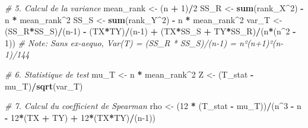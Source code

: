 \documentclass[
  12pt,
]{article}
\newenvironment{Shaded}{\begin{snugshade}}{\end{snugshade}}
\newcommand{\CommentTok}[1]{\textcolor[rgb]{0.56,0.35,0.01}{\textit{#1}}}
\newcommand{\DecValTok}[1]{\textcolor[rgb]{0.00,0.00,0.81}{#1}}
\newcommand{\FunctionTok}[1]{\textcolor[rgb]{0.13,0.29,0.53}{\textbf{#1}}}
\newcommand{\NormalTok}[1]{#1}
\newcommand{\OtherTok}[1]{\textcolor[rgb]{0.56,0.35,0.01}{#1}}
\newcommand{\SpecialCharTok}[1]{\textcolor[rgb]{0.81,0.36,0.00}{\textbf{#1}}}
\begin{document}
\begin{Shaded}
\begin{Highlighting}[]
  \CommentTok{\# 5. Calcul de la variance}
\NormalTok{  mean\_rank }\OtherTok{\textless{}{-}}\NormalTok{ (n }\SpecialCharTok{+} \DecValTok{1}\NormalTok{)}\SpecialCharTok{/}\DecValTok{2}
\NormalTok{  SS\_R }\OtherTok{\textless{}{-}} \FunctionTok{sum}\NormalTok{(rank\_X}\SpecialCharTok{\^{}}\DecValTok{2}\NormalTok{) }\SpecialCharTok{{-}}\NormalTok{ n }\SpecialCharTok{*}\NormalTok{ mean\_rank}\SpecialCharTok{\^{}}\DecValTok{2}
\NormalTok{  SS\_S }\OtherTok{\textless{}{-}} \FunctionTok{sum}\NormalTok{(rank\_Y}\SpecialCharTok{\^{}}\DecValTok{2}\NormalTok{) }\SpecialCharTok{{-}}\NormalTok{ n }\SpecialCharTok{*}\NormalTok{ mean\_rank}\SpecialCharTok{\^{}}\DecValTok{2}
\NormalTok{  var\_T }\OtherTok{\textless{}{-}}\NormalTok{ (SS\_R}\SpecialCharTok{*}\NormalTok{SS\_S)}\SpecialCharTok{/}\NormalTok{(n}\DecValTok{{-}1}\NormalTok{) }\SpecialCharTok{{-}}\NormalTok{ (TX}\SpecialCharTok{*}\NormalTok{TY)}\SpecialCharTok{/}\NormalTok{(n}\DecValTok{{-}1}\NormalTok{) }\SpecialCharTok{+}\NormalTok{ (TX}\SpecialCharTok{*}\NormalTok{SS\_S }\SpecialCharTok{+}\NormalTok{ TY}\SpecialCharTok{*}\NormalTok{SS\_R)}\SpecialCharTok{/}\NormalTok{(n}\SpecialCharTok{*}\NormalTok{(n}\SpecialCharTok{\^{}}\DecValTok{2} \SpecialCharTok{{-}} \DecValTok{1}\NormalTok{))}
  \CommentTok{\# Note: Sans ex{-}aequo, Var(T) = (SS\_R * SS\_S)/(n{-}1) = n²(n+1)²(n{-}1)/144}
  
  \CommentTok{\# 6. Statistique de test}
\NormalTok{  mu\_T }\OtherTok{\textless{}{-}}\NormalTok{ n }\SpecialCharTok{*}\NormalTok{ mean\_rank}\SpecialCharTok{\^{}}\DecValTok{2}
\NormalTok{  Z }\OtherTok{\textless{}{-}}\NormalTok{ (T\_stat }\SpecialCharTok{{-}}\NormalTok{ mu\_T)}\SpecialCharTok{/}\FunctionTok{sqrt}\NormalTok{(var\_T)}
  
  \CommentTok{\# 7. Calcul du coefficient de Spearman}
\NormalTok{  rho }\OtherTok{\textless{}{-}}\NormalTok{ (}\DecValTok{12} \SpecialCharTok{*}\NormalTok{ (T\_stat }\SpecialCharTok{{-}}\NormalTok{ mu\_T))}\SpecialCharTok{/}\NormalTok{(n}\SpecialCharTok{\^{}}\DecValTok{3} \SpecialCharTok{{-}}\NormalTok{ n }\SpecialCharTok{{-}} \DecValTok{12}\SpecialCharTok{*}\NormalTok{(TX }\SpecialCharTok{+}\NormalTok{ TY) }\SpecialCharTok{+} \DecValTok{12}\SpecialCharTok{*}\NormalTok{(TX}\SpecialCharTok{*}\NormalTok{TY)}\SpecialCharTok{/}\NormalTok{(n}\DecValTok{{-}1}\NormalTok{))}
  

\end{Highlighting}
\end{Shaded}
\end{document}
